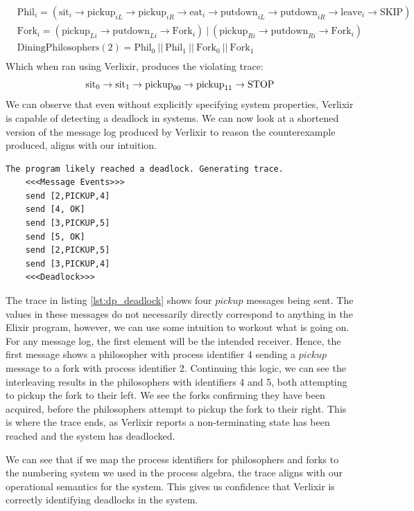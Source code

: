 \[
\begin{aligned}
    & \text{Phil}_i = (\text{sit}_{i} \rightarrow \text{pickup}_{iL} \rightarrow \text{pickup}_{iR}\rightarrow \text{eat}_{i} \rightarrow \text{putdown}_{iL} \rightarrow \text{putdown}_{iR}\rightarrow \text{leave}_i \rightarrow \text{SKIP}) \\
    & \text{Fork}_i = (\text{pickup}_{Li} \rightarrow \text{putdown}_{Li} \rightarrow \text{Fork}_{i}) \ | \ (\text{pickup}_{Ri} \rightarrow \text{putdown}_{Ri} \rightarrow \text{Fork}_i) \\
    & \text{DiningPhilosophers}(2) = \text{Phil}_0 \ || \ \text{Phil}_1 \ || \ \text{Fork}_0 \ || \ \text{Fork}_1 \\
\end{aligned}
\]
Which when ran using Verlixir, produces the violating trace:
\[
    \text{sit}_0 \rightarrow \text{sit}_1 \rightarrow \text{pickup}_{00} \rightarrow \text{pickup}_{11} \rightarrow \text{STOP} \\
\]
We can observe that even without explicitly specifying system properties, Verlixir is capable of detecting a deadlock in systems. We can now look at a shortened version of the message log produced by Verlixir to reason the counterexample produced, aligns with our intuition.
\begin{lstlisting}[xleftmargin=.01\linewidth, xrightmargin=0.01\linewidth, caption={Message log produced by counterexample of a Dining Philosophers deadlock.}, label={lst:dp_deadlock}]
    The program likely reached a deadlock. Generating trace.
    <<<Message Events>>>
    send [2,PICKUP,4]
    send [4, OK]
    send [3,PICKUP,5]
    send [5, OK]
    send [2,PICKUP,5]
    send [3,PICKUP,4]
    <<<Deadlock>>>
\end{lstlisting}
The trace in listing \ref{lst:dp_deadlock} shows four $pickup$ messages being sent. The values in these messages do not necessarily directly correspond to anything in the Elixir program, however, we can use some intuition to workout what is going on. For any message log, the first element will be the intended receiver. Hence, the first message shows a philosopher with process identifier 4 sending a $pickup$ message to a fork with process identifier 2. Continuing this logic, we can see the interleaving results in the philosophers with identifiers 4 and 5, both attempting to pickup the fork to their left. We see the forks confirming they have been acquired, before the philosophers attempt to pickup the fork to their right. This is where the trace ends, as Verlixir reports a non-terminating state has been reached and the system has deadlocked.
\par
We can see that if we map the process identifiers for philosophers and forks to the numbering system we used in the process algebra, the trace aligns with our operational semantics for the system. This gives us confidence that Verlixir is correctly identifying deadlocks in the system.

